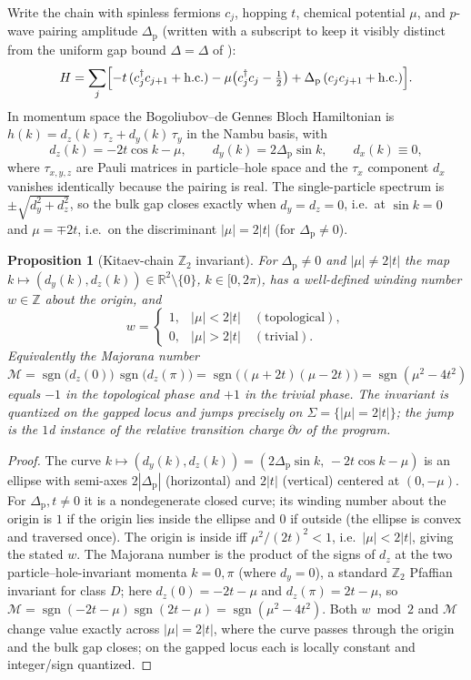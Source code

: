 \documentclass[12pt]{article}
\newcommand{\gapbound}{\Delta}                  %
\newcommand{\Sig}{\Sigma}                       %
\newcommand{\rc}{\partial\nu}                   %
\newcommand{\Maj}{\mathcal{M}}                   %
\newcommand{\winding}{w}                         %
\newcommand{\Ztwo}{\mathbb{Z}_2}
\newcommand{\Zint}{\mathbb{Z}}
\DeclareMathOperator{\sgn}{sgn}
\newtheorem{proposition}[theorem]{Proposition}
\theoremstyle{definition}
\theoremstyle{remark}
\begin{document}
Write the chain with spinless fermions $c_j$, hopping $t$, chemical potential $\mu$, and
$p$-wave pairing amplitude $\Delta_{\mathrm{p}}$ (written with a subscript to keep it visibly
distinct from the uniform gap bound $\gapbound=\Delta$ of ):
\[
  H = \sum_j\Bigl[-t\,(c_j^\dagger c_{j+1}+\mathrm{h.c.})
      -\mu\bigl(c_j^\dagger c_j-\tfrac12\bigr)
      +\Delta_{\mathrm{p}}\,(c_j c_{j+1}+\mathrm{h.c.})\Bigr].
\]
In momentum space the Bogoliubov--de Gennes Bloch Hamiltonian is
$h(k)=d_z(k)\,\tau_z+d_y(k)\,\tau_y$ in the Nambu basis, with
\[
  d_z(k) = -2t\cos k-\mu, \qquad d_y(k) = 2\Delta_{\mathrm{p}}\sin k, \qquad d_x(k)\equiv 0,
\]
where $\tau_{x,y,z}$ are Pauli matrices in particle--hole space and the $\tau_x$ component
$d_x$ vanishes identically because the pairing is real. The single-particle spectrum is
$\pm\sqrt{d_y^2+d_z^2}$, so the bulk gap closes exactly when $d_y=d_z=0$, i.e.\ at
$\sin k=0$ and $\mu=\mp2t$, i.e.\ on the discriminant $|\mu|=2|t|$ (for $\Delta_{\mathrm{p}}\ne0$).

\begin{proposition}[Kitaev-chain $\Ztwo$ invariant]
\label{prop:kitaev}
For $\Delta_{\mathrm{p}}\ne0$ and $|\mu|\ne2|t|$ the map $k\mapsto(d_y(k),d_z(k))\in\mathbb{R}^2\setminus\{0\}$,
$k\in[0,2\pi)$, has a well-defined winding number $\winding\in\Zint$ about the origin, and
\[
  \winding =
  \begin{cases}
    1, & |\mu|<2|t| \quad(\text{topological}),\\[2pt]
    0, & |\mu|>2|t| \quad(\text{trivial}).
  \end{cases}
\]
Equivalently the Majorana number $\Maj=\sgn\!\bigl(d_z(0)\bigr)\,\sgn\!\bigl(d_z(\pi)\bigr)
=\sgn\!\bigl((\mu+2t)(\mu-2t)\bigr)=\sgn(\mu^2-4t^2)$ equals $-1$ in the topological phase
and $+1$ in the trivial phase. The invariant is quantized on the gapped locus and jumps
precisely on $\Sig=\{|\mu|=2|t|\}$; the jump is the $1$d instance of the relative transition
charge $\rc$ of the program.
\end{proposition}

\begin{proof}
The curve $k\mapsto(d_y(k),d_z(k))=(2\Delta_{\mathrm{p}}\sin k,\,-2t\cos k-\mu)$ is an ellipse with
semi-axes $2|\Delta_{\mathrm{p}}|$ (horizontal) and $2|t|$ (vertical) centered at $(0,-\mu)$. For
$\Delta_{\mathrm{p}},t\ne0$ it is a nondegenerate closed curve; its winding number about the origin is
$1$ if the origin lies inside the ellipse and $0$ if outside (the ellipse is convex and
traversed once). The origin is inside iff $\mu^2/(2t)^2<1$, i.e.\ $|\mu|<2|t|$, giving the
stated $\winding$. The Majorana number is the product of the signs of $d_z$ at the two
particle--hole-invariant momenta $k=0,\pi$ (where $d_y=0$), a standard $\Ztwo$ Pfaffian
invariant for class $D$; here $d_z(0)=-2t-\mu$ and $d_z(\pi)=2t-\mu$, so
$\Maj=\sgn(-2t-\mu)\sgn(2t-\mu)=\sgn(\mu^2-4t^2)$. Both $\winding\bmod2$ and $\Maj$ change
value exactly across $|\mu|=2|t|$, where the curve passes through the origin and the bulk gap
closes; on the gapped locus each is locally constant and integer/sign quantized.
\end{proof}
\end{document}
